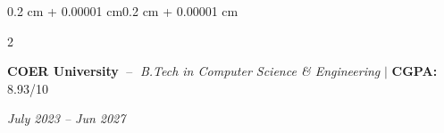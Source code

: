 \documentclass[10pt, letterpaper]{article}
\newenvironment{onecolentry}{
    \begin{adjustwidth}{0.2 cm + 0.00001 cm}{0.2 cm + 0.00001 cm}
}{
    \end{adjustwidth}
}
\newenvironment{twocolentry}[2][]{
    \onecolentry
    \def\secondColumn{#2}
    \setcolumnwidth{\fill, 4.5 cm}
    \begin{paracol}{2}
}{
    \switchcolumn \raggedleft \secondColumn
    \end{paracol}
    \endonecolentry
}
\begin{document}
    \begin{twocolentry}{\textit{July 2023 -- Jun 2027}}
        \textbf{COER University}
        $\;$--$\;$ \textit{B.Tech in Computer Science \& Engineering}
        \quad $|$ \quad \textbf{CGPA:} 8.93/10
        \end{twocolentry}
        
\vspace{0.10 cm}
    


\end{document}

